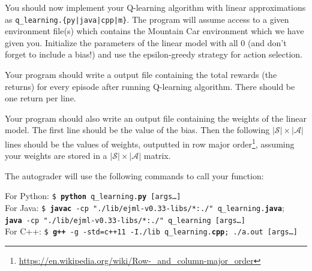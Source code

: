 \documentclass[11pt]{article}
\numberwithin{equation}{section} %
\numberwithin{figure}{section} %
\numberwithin{table}{section} %
\begin{document}
You should now implement your Q-learning algorithm with linear approximations as \newline\texttt{q\_learning.\{py|java|cpp|m\}}. The program will assume access to a given environment file(s) which contains the Mountain Car environment which we have given you. Initialize the parameters of the linear model with all 0 (and don't forget to include a bias!) and use the epsilon-greedy strategy for action selection.

Your program should write a output file containing the total rewards (the returns) for every episode after running Q-learning algorithm. There should be one return per line.

Your program should also write an output file containing the weights of the linear model. The first line should be the value of the bias. Then the following $|\mathcal{S}| \times |\mathcal{A}|$ lines should be the values of weights, outputted in row major order\footnote{\url{https://en.wikipedia.org/wiki/Row-_and_column-major_order}}, assuming your weights are stored in a $|\mathcal{S}| \times |\mathcal{A}|$ matrix.

The autograder will use the following commands to call your function:

\begin{tabbing}
For Python: \=\texttt{\$ \textbf{python} q\_learning.\textbf{py} [args\dots]}\\
For Java: \>\texttt{\$ \textbf{javac} -cp "./lib/ejml-v0.33-libs/*:./" q\_learning.\textbf{java}};\\ \>  \texttt{\textbf{java} -cp "./lib/ejml-v0.33-libs/*:./" q\_learning [args\dots]}\\
For C++: \>\texttt{\$ \textbf{g++} -g -std=c++11 -I./lib q\_learning.\textbf{cpp}; ./a.out [args\dots]}\\
\end{tabbing}
\end{document}
